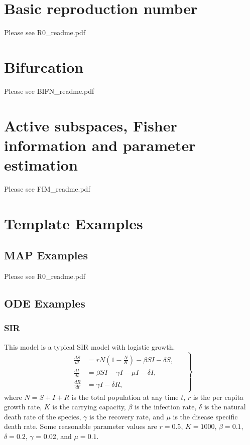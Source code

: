 \documentclass[12pt]{article}
\begin{document}
\section{Basic reproduction number}

 Please see R0\_readme.pdf

\section{Bifurcation}

  Please see BIFN\_readme.pdf

\section{Active subspaces, Fisher information and parameter estimation}

  Please see FIM\_readme.pdf



\section{Template Examples}

\subsection{MAP Examples}

  Please see R0\_readme.pdf

\subsection{ODE Examples}

\subsubsection{SIR}

This model is a typical SIR model with logistic growth.
%
\begin{equation*}\label{eq:SIR_log}
\left . \begin{gathered} \begin{aligned}
\frac{dS}{dt} &= rN \left( 1-\frac{N}{K}\right) - \beta SI - \delta S, \quad \\
\frac{dI}{dt} &= \beta SI - \gamma I - \mu I - \delta I, \\
\frac{dR}{dt} &= \gamma I - \delta R,
\end{aligned} \end{gathered} \right \}
\end{equation*}
%
where $N = S+I+R$ is the total population at any time $t$, $r$ is the per capita growth rate, $K$ is the carrying capacity, $\beta$ is the infection rate, $\delta$ is the natural death rate of the species, $\gamma$ is the recovery rate, and $\mu$ is the disease specific death rate.  Some reasonable parameter values are $r = 0.5$, $K=1000$, $\beta = 0.1$, $\delta = 0.2$, $\gamma$ = 0.02, and $\mu = 0.1$.
\end{document}
